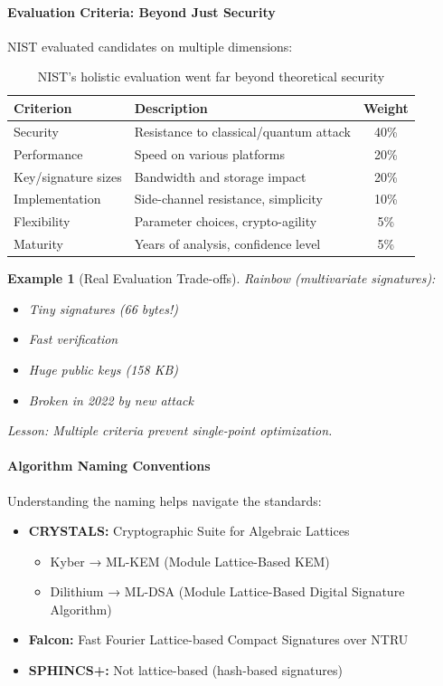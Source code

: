 \documentclass[11pt,a4paper]{article}
\newcommand{\xmark}{\ding{55}}
\newtheorem{example}{Example}
\begin{document}
\paragraph{Evaluation Criteria: Beyond Just Security}

NIST evaluated candidates on multiple dimensions:

\begin{table}[h]
\centering
\begin{tabular}{|l|l|c|}
\hline
\textbf{Criterion} & \textbf{Description} & \textbf{Weight} \\
\hline
Security & Resistance to classical/quantum attack & 40\% \\
Performance & Speed on various platforms & 20\% \\
Key/signature sizes & Bandwidth and storage impact & 20\% \\
Implementation & Side-channel resistance, simplicity & 10\% \\
Flexibility & Parameter choices, crypto-agility & 5\% \\
Maturity & Years of analysis, confidence level & 5\% \\
\hline
\end{tabular}
\caption{NIST's holistic evaluation went far beyond theoretical security}
\end{table}

\begin{example}[Real Evaluation Trade-offs]
Rainbow (multivariate signatures):
\begin{itemize}
    \item \checkmark Tiny signatures (66 bytes!)
    \item \checkmark Fast verification
    \item \xmark Huge public keys (158 KB)
    \item \xmark Broken in 2022 by new attack
\end{itemize}
Lesson: Multiple criteria prevent single-point optimization.
\end{example}

\paragraph{Algorithm Naming Conventions}

Understanding the naming helps navigate the standards:

\begin{itemize}
    \item \textbf{CRYSTALS:} Cryptographic Suite for Algebraic Lattices
    \begin{itemize}
        \item Kyber → ML-KEM (Module Lattice-Based KEM)
        \item Dilithium → ML-DSA (Module Lattice-Based Digital Signature Algorithm)
    \end{itemize}
    \item \textbf{Falcon:} Fast Fourier Lattice-based Compact Signatures over NTRU
    \item \textbf{SPHINCS+:} Not lattice-based (hash-based signatures)
\end{itemize}
\end{document}
